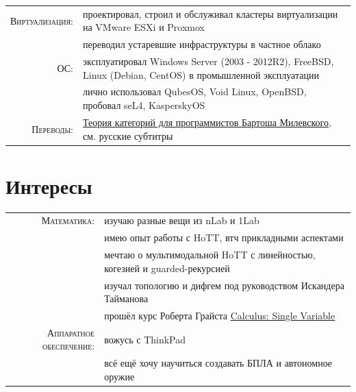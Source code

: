 \documentclass[a4paper,11pt]{article}
\begin{document}
\begin{longtable}{rp{}}
      \textsc{Виртуализация:} & проектировал, строил и обслуживал кластеры виртуализации на VMware ESXi и Proxmox  \\
                              & переводил устаревшие инфраструктуры в частное облако                               \\

      \textsc{ОС:} & эксплуатировал Windows Server (2003 - 2012R2), FreeBSD, Linux (Debian, CentOS) в промышленной эксплуатации  \\
                   & лично использовал QubesOS, Void Linux, OpenBSD, пробовал seL4, KasperskyOS                                  \\

      \textsc{Переводы:} & \href{https://www.youtube.com/playlist?list=PLbgaMIhjbmEnaH\_LTkxLI7FMa2HsnawM\_}
                               {Теория категорий для программистов Бартоша Милевского}, см. русские субтитры  \\
    \end{longtable}

  \section{Интересы}
    \begin{tabular}{rl}
      \textsc{Математика:} & изучаю разные вещи из nLab и 1Lab                                          \\
                           & имею опыт работы с HoTT, втч прикладными аспектами                         \\
                           & мечтаю о мультимодальной HoTT с линейностью, когезией и guarded-рекурсией  \\
                           & изучал топологию и дифгем под руководством Искандера Тайманова             \\
                           & прошёл курс Роберта Грайста
                              \href{https://www.coursera.org/account/accomplishments/records/9Y3N9X2BMR}{Calculus:
                              Single Variable}                                                                      \\
      \textsc{Аппаратное обеспечение:} & вожусь с ThinkPad                                          \\
                                       & всё ещё хочу научиться создавать БПЛА и автономное оружие  \\
    \end{tabular}
\end{document}
